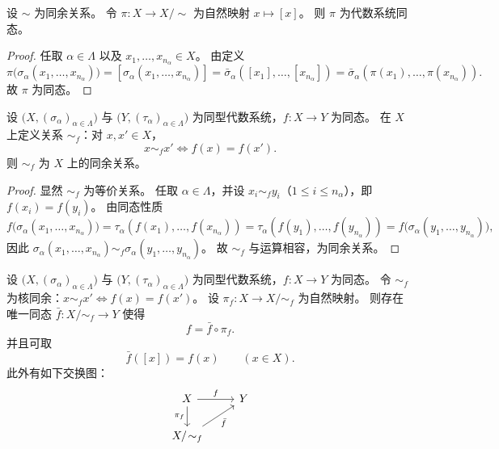 \documentclass[lang=cn,a4paper,newtx]{elegantbook}
\begin{document}
\begin{proposition}
设 $\sim$ 为同余关系。
令 $\pi:X\to X/\!\sim$ 为自然映射 $x\mapsto [x]$。
则 $\pi$ 为代数系统同态。
\end{proposition}

\begin{proof}
任取 $\alpha\in\Lambda$ 以及 $x_1,\dots,x_{n_{\alpha}}\in X$。
由定义
\[
  \pi\bigl(\sigma_{\alpha}(x_1,\dots,x_{n_{\alpha}})\bigr)=[\sigma_{\alpha}(x_1,\dots,x_{n_{\alpha}})]=\bar{\sigma}_{\alpha}([x_1],\dots,[x_{n_{\alpha}}])=\bar{\sigma}_{\alpha}(\pi(x_1),\dots,\pi(x_{n_{\alpha}})).
\]
故 $\pi$ 为同态。
\end{proof}

\begin{proposition}
设 $\bigl(X,(\sigma_{\alpha})_{\alpha\in\Lambda}\bigr)$ 与 $\bigl(Y,(\tau_{\alpha})_{\alpha\in\Lambda}\bigr)$ 为同型代数系统，$f:X\to Y$ 为同态。
在 $X$ 上定义关系 $\sim_f$：对 $x,x'\in X$，
\[
  x\sim_f x'\iff f(x)=f(x').
\]
则 $\sim_f$ 为 $X$ 上的同余关系。
\end{proposition}

\begin{proof}
显然 $\sim_f$ 为等价关系。
任取 $\alpha\in\Lambda$，并设 $x_i\sim_f y_i$（$1\le i\le n_{\alpha}$），即 $f(x_i)=f(y_i)$。
由同态性质
\[
  f\bigl(\sigma_{\alpha}(x_1,\dots,x_{n_{\alpha}})\bigr)=\tau_{\alpha}(f(x_1),\dots,f(x_{n_{\alpha}}))=\tau_{\alpha}(f(y_1),\dots,f(y_{n_{\alpha}}))=f\bigl(\sigma_{\alpha}(y_1,\dots,y_{n_{\alpha}})\bigr),
\]
因此 $\sigma_{\alpha}(x_1,\dots,x_{n_{\alpha}})\sim_f \sigma_{\alpha}(y_1,\dots,y_{n_{\alpha}})$。
故 $\sim_f$ 与运算相容，为同余关系。
\end{proof}

\begin{proposition}
设 $\bigl(X,(\sigma_{\alpha})_{\alpha\in\Lambda}\bigr)$ 与 $\bigl(Y,(\tau_{\alpha})_{\alpha\in\Lambda}\bigr)$ 为同型代数系统，$f:X\to Y$ 为同态。
令 $\sim_f$ 为核同余：$x\sim_f x'\iff f(x)=f(x')$。
设 $\pi_f:X\to X/\!\sim_f$ 为自然映射。
则存在唯一同态 $\bar f:X/\!\sim_f\to Y$ 使得
\[
  f=\bar f\circ \pi_f.
\]
并且可取
\[
  \bar f([x])=f(x)\qquad (x\in X).
\]
此外有如下交换图：
\[
\begin{tikzcd}
 X \arrow[r,"f"] \arrow[d,"\pi_f"'] & Y \\
 X/\!\sim_f \arrow[ur,"\bar f"']
\end{tikzcd}
\]
\end{proposition}
\end{document}
